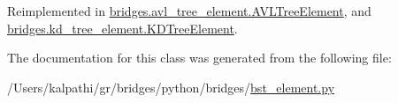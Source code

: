 Reimplemented in \mbox{\hyperlink{classbridges_1_1avl__tree__element_1_1_a_v_l_tree_element_a5aa36d46b0c6ac791893823500c77a08}{bridges.\+avl\+\_\+tree\+\_\+element.\+A\+V\+L\+Tree\+Element}}, and \mbox{\hyperlink{classbridges_1_1kd__tree__element_1_1_k_d_tree_element_a89071f192bee403a44f92c86a5fdc49d}{bridges.\+kd\+\_\+tree\+\_\+element.\+K\+D\+Tree\+Element}}.



The documentation for this class was generated from the following file\+:\begin{DoxyCompactItemize}
\item 
/\+Users/kalpathi/gr/bridges/python/bridges/\mbox{\hyperlink{bst__element_8py}{bst\+\_\+element.\+py}}\end{DoxyCompactItemize}
